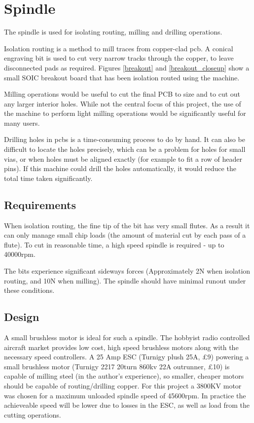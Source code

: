 \section{Spindle}
The spindle is used for isolating routing, milling and drilling operations.

Isolation routing is a method to mill traces from copper-clad pcb. A conical engraving bit is used to cut very narrow tracks through
the copper, to leave disconnected pads as required. Figures \ref{breakout} and \ref{breakout_closeup} show a small SOIC breakout board that has been isolation routed using the machine. 


Milling operations would be useful to cut the final PCB to size and to
cut out any larger interior holes. While not the central focus of this
project, the use of the machine to perform light milling operations
would be significantly useful for many users.

Drilling holes in pcbs is a time-consuming process to do by hand. It can also be difficult to locate the holes precisely, which can be a problem
for holes for small \gls{via}s, or when holes must be aligned exactly (for example to fit a row of header pins). If this machine could drill the holes automatically,
it would reduce the total time taken significantly.

\subsection{Requirements}
When isolation routing, the fine tip of the bit has very small flutes. As a result it can only manage
small chip loads (the amount of material cut by each pass of a flute). To cut in reasonable time, a high speed spindle is required - up to 40000rpm.

The bits experience significant sideways forces (Approximately 2N when isolation routing, and 10N when milling). The spindle
should have minimal runout under these conditions.

\subsection{Design}
A small brushless motor is ideal for such a spindle. The hobbyist radio
controlled aircraft market provides low cost, high speed brushless motors
along with the necessary speed controllers. A 25 Amp \gls{ESC} 
(Turnigy plush 25A, \pounds 9) powering a small brushless motor 
(Turnigy 2217 20turn 860kv 22A outrunner, \pounds 10) is capable of milling
steel (in the author's experience), so smaller, cheaper motors should be 
capable of routing/drilling copper. For this project a 3800KV motor was
chosen for a maximum unloaded spindle speed of 45600rpm. In practice the
achieveable speed will be lower due to losses in the ESC, as well as load
from the cutting operations.

